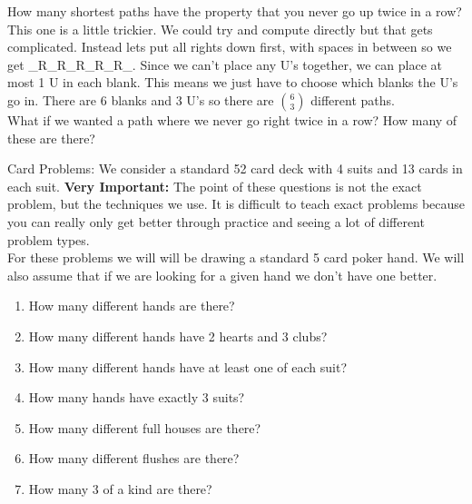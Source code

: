 \documentclass[14,fleqn]{article}
\begin{document}
How many shortest paths have the property that you never go up twice in a row?\\
This one is a little trickier. We could try and compute directly but that gets complicated. Instead lets put all rights down first, with spaces in between so we get \_R\_R\_R\_R\_R\_. Since we can't place any U's together, we can place at most 1 U in each blank. This means we just have to choose which blanks the U's go in. There are 6 blanks and 3 U's so there are $\binom{6}{3}$ different paths.\\
What if we wanted a path where we never go right twice in a row? How many of these are there?

Card Problems: We consider a standard 52 card deck with 4 suits and 13 cards in each suit. \textbf{Very Important:} The point of these questions is not the exact problem, but the techniques we use. It is difficult to teach exact problems because you can really only get better through practice and seeing a lot of different problem types.\\

For these problems we will will be drawing a standard 5 card poker hand. We will also assume that if we are looking for a given hand we don't have one better.
\begin{enumerate}
	\item How many different hands are there?
	\item How many different hands have 2 hearts and 3 clubs?
	\item How many different hands have at least one of each suit?
	\item How many hands have exactly 3 suits?
	\item How many different full houses are there?
	\item How many different flushes are there?
	\item How many 3 of a kind are there?
\end{enumerate}
\end{document}
